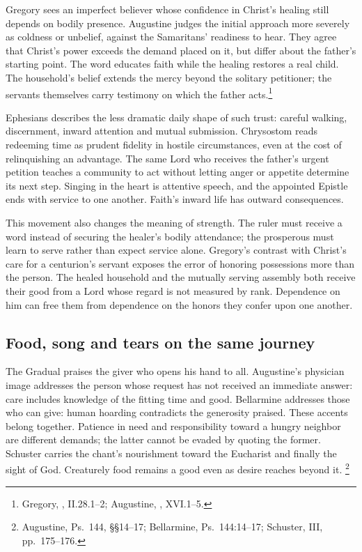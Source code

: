 Gregory sees an imperfect believer whose confidence in Christ's healing
still depends on bodily presence. Augustine judges the initial approach
more severely as coldness or unbelief, against the Samaritans' readiness
to hear. They agree that Christ's power exceeds the demand placed on it,
but differ about the father's starting point. The word educates faith
while the healing restores a real child. The household's belief extends
the mercy beyond the solitary petitioner; the servants themselves carry
testimony on which the father acts.\footnote{Gregory, , II.28.1--2; Augustine, , XVI.1--5.}

Ephesians describes the less dramatic daily shape of such trust: careful
walking, discernment, inward attention and mutual submission. Chrysostom
reads redeeming time as prudent fidelity in hostile circumstances, even
at the cost of relinquishing an advantage. The same Lord who receives
the father's urgent petition teaches a community to act without letting
anger or appetite determine its next step. Singing in the heart is
attentive speech, and the appointed Epistle ends with service to one
another. Faith's inward life has outward consequences.

This movement also changes the meaning of strength. The ruler must
receive a word instead of securing the healer's bodily attendance;
the prosperous must learn to serve rather than expect service alone.
Gregory's contrast with Christ's care for a centurion's servant exposes
the error of honoring possessions more than the person. The healed
household and the mutually serving assembly both receive their good
from a Lord whose regard is not measured by rank. Dependence on him
can free them from dependence on the honors they confer upon one another.

\newpage
\subsection{Food, song and tears on the same journey}
The Gradual praises the giver who opens his hand to all. Augustine's
physician image addresses the person whose request has not received an
immediate answer: care includes knowledge of the fitting time and good.
Bellarmine addresses those who can give: human hoarding contradicts
the generosity praised. These accents belong together. Patience in
need and responsibility toward a hungry neighbor are different demands;
the latter cannot be evaded by quoting the former. Schuster carries
the chant's nourishment toward the Eucharist and finally the sight of
God. Creaturely food remains a good even as desire reaches beyond it.
\footnote{Augustine, Ps.~144, \S\S14--17; Bellarmine, Ps.~144:14--17;
Schuster, III, pp.~175--176.}

